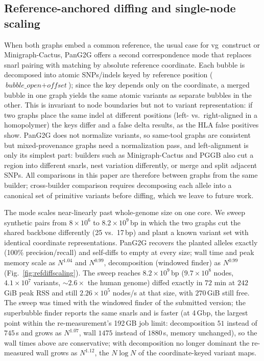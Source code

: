 \subsection{Reference-anchored diffing and single-node scaling}
\label{sec:refdiff}
When both graphs embed a common reference, the usual case for vg~construct or Minigraph-Cactus, PanG2G offers a second correspondence mode that replaces snarl pairing with matching by absolute reference coordinate. Each bubble is decomposed into atomic SNPs/indels keyed by reference position ($\textit{bubble\_open}+\textit{offset}$); since the key depends only on the coordinate, a merged bubble in one graph yields the same atomic variants as separate bubbles in the other. This is invariant to node boundaries but not to variant representation: if two graphs place the same indel at different positions (left- vs.\ right-aligned in a homopolymer) the keys differ and a false delta results, as the HLA false positives show. PanG2G does not normalize variants, so same-tool graphs are consistent but mixed-provenance graphs need a normalization pass, and left-alignment is only its simplest part: builders such as Minigraph-Cactus and PGGB also cut a region into different snarls, nest variation differently, or merge and split adjacent SNPs. All comparisons in this paper are therefore between graphs from the same builder; cross-builder comparison requires decomposing each allele into a canonical set of primitive variants before diffing, which we leave to future work.

The mode scales near-linearly past whole-genome size on one core. We sweep synthetic pairs from $8{\times}10^6$ to $8.2{\times}10^9$\,bp in which the two graphs cut the shared backbone differently (25 vs.\ 17\,bp) and plant a known variant set with identical coordinate representations. PanG2G recovers the planted alleles exactly (100\% precision/recall) and self-diffs to empty at every size; wall time and peak memory scale as $N^{1.04}$ and $N^{0.99}$, decomposition (windowed finder) as $N^{0.99}$ (Fig.~\ref{fig:refdiffscaling}). The sweep reaches $8.2{\times}10^9$\,bp ($9.7{\times}10^{8}$ nodes, $4.1{\times}10^{7}$ variants, $\sim\!2.6\times$ the human genome) diffed exactly in $72$ min at $242$\,GiB peak RSS and still $2.26{\times}10^{5}$ nodes/s at that size, with $270$\,GiB still free. The sweep was timed with the windowed finder of the submitted version; the superbubble finder reports the same snarls and is faster (at 4\,Gbp, the largest point within the re-measurement's 192\,GB job limit: decomposition $51$ instead of $745$\,s and grows as $N^{1.07}$, wall $1475$ instead of $1880$\,s, memory unchanged), so the wall times above are conservative; with decomposition no longer dominant the re-measured wall grows as $N^{1.12}$, the $N\log N$ of the coordinate-keyed variant maps.

